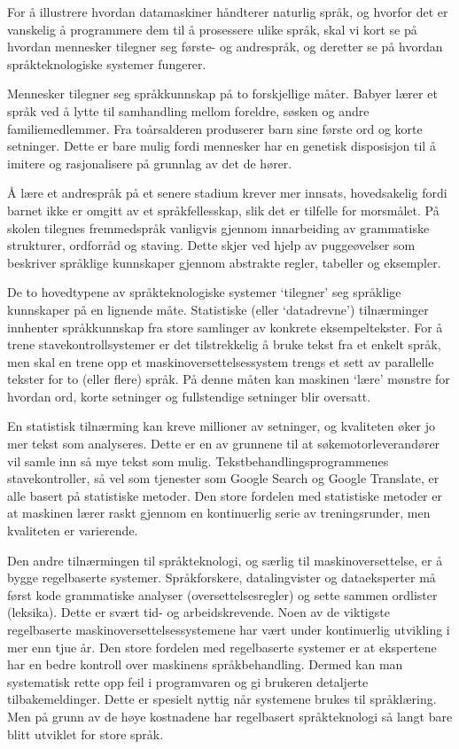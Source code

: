 \begin{multicols}{2}
For å illustrere hvordan datamaskiner håndterer naturlig språk, og hvorfor det er vanskelig å programmere dem til å prosessere ulike språk, skal vi kort se på hvordan mennesker tilegner seg første- og andrespråk, og deretter se på hvordan språkteknologiske systemer fungerer.

Mennesker tilegner seg språkkunnskap på to forskjellige måter. Babyer lærer et språk ved å lytte til samhandling mellom  foreldre, søsken og andre familiemedlemmer. Fra toårsalderen produserer barn sine første ord og korte setninger. Dette er bare mulig fordi mennesker har en genetisk disposisjon til å imitere og rasjonalisere på grunnlag av det de hører.

Å lære et andrespråk på et senere stadium krever mer innsats, hovedsakelig fordi barnet ikke er omgitt av et språkfellesskap, slik det er tilfelle for morsmålet. På skolen tilegnes fremmedspråk vanligvis gjennom innarbeiding av grammatiske strukturer, ordforråd og staving. Dette skjer ved hjelp av puggeøvelser som beskriver språklige kunnskaper gjennom abstrakte regler, tabeller og eksempler. 


De to hovedtypene av språkteknologiske systemer `tilegner' seg språklige kunnskaper på en lignende måte. Statistiske (eller `datadrevne') tilnærminger innhenter språkkunnskap fra store samlinger av konkrete eksempeltekster. For å trene stavekontrollsystemer er det tilstrekkelig å bruke tekst fra et enkelt språk, men skal en trene opp et maskinoversettelsessystem trengs et sett av parallelle tekster for to (eller flere) språk. På denne måten kan maskinen `lære' mønstre for hvordan ord, korte setninger og fullstendige setninger blir oversatt.

En statistisk tilnærming kan kreve millioner av setninger, og kvaliteten øker jo mer tekst som analyseres. Dette er en av grunnene til at  søkemotorleverandører vil samle inn så mye tekst som mulig. Tekstbehandlingsprogrammenes stavekontroller, så vel som tjenester som Google Search og Google Translate, er alle basert på statistiske metoder. Den store fordelen med statistiske metoder er at maskinen lærer raskt gjennom en kontinuerlig serie av treningsrunder, men kvaliteten er varierende.

Den andre tilnærmingen til språkteknologi, og særlig til maskinoversettelse, er å bygge regelbaserte systemer. Språkforskere, datalingvister og dataeksperter må først kode grammatiske analyser (oversettelsesregler) og sette sammen ordlister (leksika). Dette er svært tid- og arbeidskrevende. Noen av de viktigste regelbaserte maskinoversettelsessystemene har vært under kontinuerlig utvikling i mer enn tjue år. Den store fordelen med regelbaserte systemer er at ekspertene har en bedre  kontroll over maskinens språkbehandling. Dermed kan man systematisk rette opp feil i programvaren og gi brukeren detaljerte tilbakemeldinger. Dette er spesielt nyttig når systemene brukes til  språklæring. Men på grunn av de høye kostnadene har regelbasert språkteknologi så langt bare blitt utviklet for store språk.


\end{multicols}
